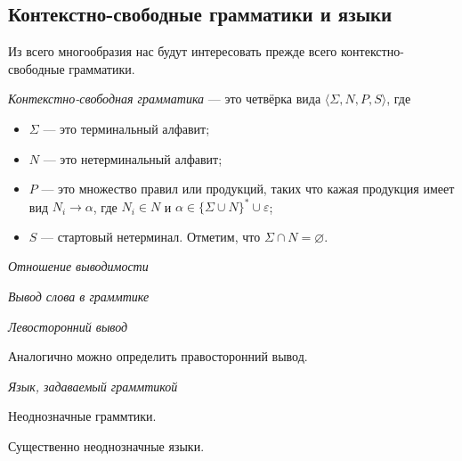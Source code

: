 \subsection{Контекстно-свободные грамматики и языки}

Из всего многообразия нас будут интересовать прежде всего контекстно-свободные грамматики.

\begin{definition}
\textit{Контекстно-свободная грамматика} --- это четвёрка вида $\langle \Sigma, N, P, S \rangle$, где
\begin{itemize}
  \item $\Sigma$ --- это терминальный алфавит;
  \item $N$ --- это нетерминальный алфавит;
  \item $P$ --- это множество правил или продукций, таких что кажая продукция имеет вид $N_i \to \alpha$, где $N_i \in N$ и $\alpha \in \{\Sigma \cup N\}^* \cup {\varepsilon}$;
  \item $S$ --- стартовый нетерминал.
  Отметим, что $\Sigma \cap N = \varnothing$.
\end{itemize}
\end{definition}

\begin{definition}
\textit{Отношение выводимости}
\end{definition}

\begin{definition}
\textit{Вывод слова в граммтике}
\end{definition}

\begin{definition}
\textit{Левосторонний вывод}
\end{definition}

Аналогично можно определить правосторонний вывод.

\begin{definition}
\textit{Язык, задаваемый граммтикой}
\end{definition}

Неоднозначные граммтики.

Существенно неоднозначные языки.


